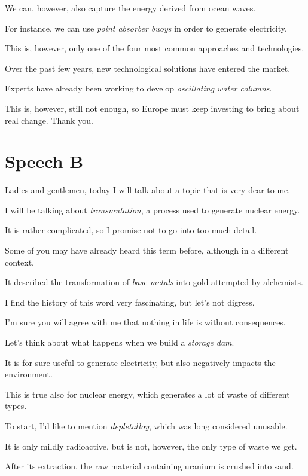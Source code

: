 \ex We can, however, also capture the energy derived from ocean waves.

For instance, we can use \textit{point absorber buoys} in order to generate electricity.

This is, however, only one of the four most common approaches and technologies.

\ex Over the past few years, new technological solutions have entered the market.

Experts have already been working to develop \textit{oscillating water columns}.

This is, however, still not enough, so Europe must keep investing to bring about real change.
Thank you.
\z

\chapter{Speech B}

\ea
Ladies and gentlemen, today I will talk about a topic that is very dear to me.

I will be talking about \textit{transmutation}, a process used to generate nuclear energy.

It is rather complicated, so I promise not to go into too much detail.

\ex Some of you may have already heard this term before, although in a different context.

It described the transformation of \textit{base metals} into gold attempted by alchemists.

I find the history of this word very fascinating, but let's not digress.

\ex I'm sure you will agree with me that nothing in life is without consequences.

Let's think about what happens when we build a \textit{storage dam}.

It is for sure useful to generate electricity, but also negatively impacts the environment.

\ex This is true also for nuclear energy, which generates a lot of waste of different types.

To start, I'd like to mention \textit{depletalloy}, which was long considered unusable.

It is only mildly radioactive, but is not, however, the only type of waste we get. 

\ex After its extraction, the raw material containing uranium is crushed into sand.

